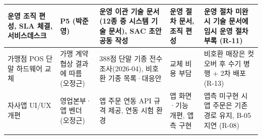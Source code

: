 \documentclass[10pt,a4paper]{article}
\begin{document}
{\begin{longtable}{|L{44mm}|L{34mm}|L{58mm}|L{40mm}|L{62mm}|}
운영 조직 편성, SLA 체결, 서비스데스크 & P5 (박준영) & 운영 이관 기술 문서(12종 중 시스템 기술 문서), SAC 초안 공동 작성 & 운영 절차 문서, 조직 편성 & 운영 절차 미완 시 기술 문서에 임시 운영 절차 부록 (R-11) \\ \hline
가맹점 POS 단말 하드웨어 교체 & 가맹 계약 협상 결과에 따름 (오정근) & 388점 단말 기종 전수 조사(2026-04), 비호환 기종 목록·대응안 & 교체 비용 부담 & 비호환 매장은 컷오버 후 수기 병행 + 2차 배포 (R-13) \\ \hline
자사앱 UI/UX 개편 & 영업본부·앱 벤더 (오정근) & 앱 주문 연동 API 규격 제공, 연동 시험 환경 & 앱 화면·기능 개편, 앱측 구현 & 앱측 미구현 시 앱 주문은 기존 경로 유지, B-05 지연 (R-08) \\ \hline
\fi
\end{longtable}}

\end{document}
